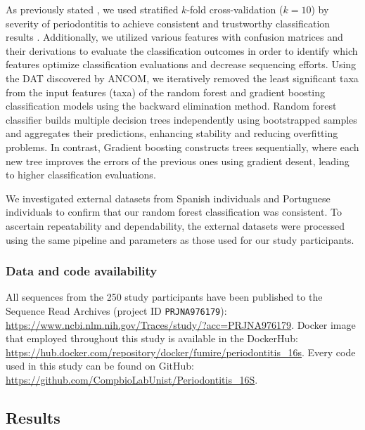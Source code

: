 \documentclass[11pt, a4paper, onecolumn, oneside]{report}
\begin{document}
                As previously stated \cite{Periodontitis-diagnosis-8}, we used stratified $k$-fold cross-validation ($k=10$) by severity of periodontitis to achieve consistent and trustworthy classification results \cite{Kfold-1}. Additionally, we utilized various features with confusion matrices and their derivations to evaluate the classification outcomes in order to identify which features optimize classification evaluations and decrease sequencing efforts. Using the DAT discovered by ANCOM, we iteratively removed the least significant taxa from the input features (taxa) of the random forest \cite{RF-1} and gradient boosting \cite{GB-1} classification models using the backward elimination method. Random forest classifier builds multiple decision trees independently using bootstrapped samples and aggregates their predictions, enhancing stability and reducing overfitting problems. In contrast, Gradient boosting constructs trees sequentially, where each new tree improves the errors of the previous ones using gradient desent, leading to higher classification evaluations.

                We investigated external datasets from Spanish individuals \cite{Periodontitis-10} and Portuguese individuals \cite{Periodontitis-Portuguese-1} to confirm that our random forest classification was consistent. To ascertain repeatability and dependability, the external datasets were processed using the same pipeline and parameters as those used for our study participants.

            \subsubsection{Data and code availability}
                All sequences from the 250 study participants have been published to the Sequence Read Archives (project ID \texttt{PRJNA976179}): \url{https://www.ncbi.nlm.nih.gov/Traces/study/?acc=PRJNA976179}. Docker image that employed throughout this study is available in the DockerHub: \url{https://hub.docker.com/repository/docker/fumire/periodontitis_16s}. Every code used in this study can be found on GitHub: \url{https://github.com/CompbioLabUnist/Periodontitis_16S}.
        \newpage

        \subsection{Results}
\end{document}
